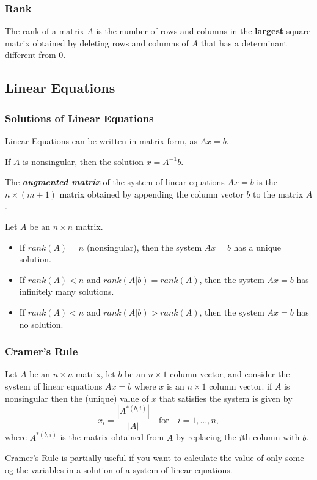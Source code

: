 \subsubsection{Rank}

\begin{definition}
	The rank of a matrix $A$ is the number of rows and columns in the \textbf{largest} square matrix obtained by deleting rows and columns of $A$ that has a determinant different from 0.
\end{definition}

\subsection{Linear Equations}

\subsubsection{Solutions of Linear Equations}

Linear Equations can be written in matrix form, as $Ax=b$.

If $A$ is nonsingular, then the solution $x = A^{-1}b$.

\begin{definition}
	The \textit{\textbf{augmented matrix}} of the system of linear equations $Ax = b$ is the $n \times (m+1)$ matrix obtained by appending the column vector $b$ to the matrix $A$.
\end{definition}

\begin{proposition}
	Let $A$ be an $n \times n$ matrix.
	\begin{itemize}
		\item If $rank(A) = n$ (nonsingular), then the system $Ax = b$ has a unique solution.
		\item If $rank(A) < n$ and $rank(A|b) = rank(A)$, then the system $Ax = b$ has infinitely many solutions.
		\item If $rank(A) < n$ and $rank(A|b) > rank(A)$, then the system $Ax = b$ has no solution.
	\end{itemize}
\end{proposition}


\subsubsection{Cramer's Rule}


\begin{proposition}
	Let $A$ be an $n \times n$ matrix, let $b$ be an $n \times 1$ column vector, and consider the system of linear equations $Ax=b$ where $x$ is an $n \times 1$ column vector. if $A$ is nonsingular then the (unique) value of $x$ that satisfies the system is given by \begin{equation*}
		x_{i} = \frac{|A^{*(b,i)}|}{|A|} \quad\text{for}\quad i = 1, \dots, n,
	\end{equation*}
	where $A^{*(b,i)}$ is the matrix obtained from $A$ by replacing the $i$th column with $b$.
\end{proposition}

Cramer's Rule is partially useful if you want to calculate the value of only some og the variables in a solution of a system of linear equations.


